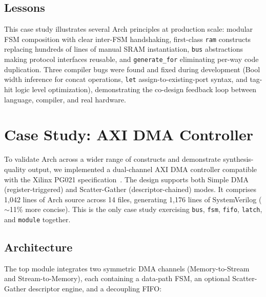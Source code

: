\documentclass[11pt,twocolumn]{article}
\begin{document}
\subsection{Lessons}

This case study illustrates several Arch principles at production scale: modular FSM composition with clear inter-FSM handshaking, first-class \texttt{ram} constructs replacing hundreds of lines of manual SRAM instantiation, \texttt{bus} abstractions making protocol interfaces reusable, and \texttt{generate\_for} eliminating per-way code duplication. Three compiler bugs were found and fixed during development (Bool width inference for concat operations, \texttt{let} assign-to-existing-port syntax, and tag-hit logic level optimization), demonstrating the co-design feedback loop between language, compiler, and real hardware.

\section{Case Study: AXI DMA Controller}\label{sec:axidma}

To validate Arch across a wider range of constructs and demonstrate synthesis-quality output, we implemented a dual-channel AXI DMA controller compatible with the Xilinx PG021 specification~\cite{pg021}. The design supports both Simple DMA (register-triggered) and Scatter-Gather (descriptor-chained) modes. It comprises 1,042 lines of Arch source across 14 files, generating 1,176 lines of SystemVerilog (${\sim}$11\% more concise). This is the only case study exercising \texttt{bus}, \texttt{fsm}, \texttt{fifo}, \texttt{latch}, and \texttt{module} together.

\subsection{Architecture}

The top module integrates two symmetric DMA channels (Memory-to-Stream and Stream-to-Memory), each containing a data-path FSM, an optional Scatter-Gather descriptor engine, and a decoupling FIFO:
\end{document}
